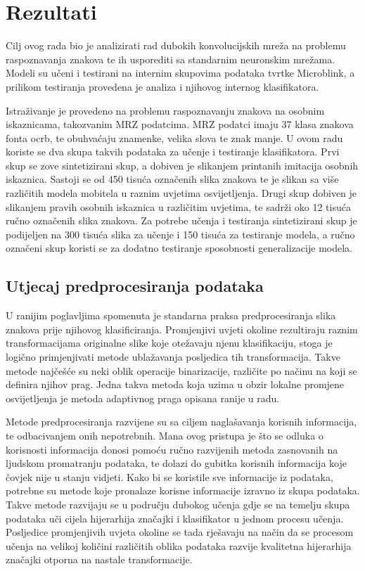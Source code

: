 \documentclass[lmodern, utf8, diplomski, numeric]{fer}
\begin{document}
\chapter{Rezultati}

Cilj ovog rada bio je analizirati rad dubokih konvolucijskih mreža na problemu raspoznavanja znakova te ih usporediti sa standarnim neuronskim mrežama. Modeli su učeni i testirani na internim skupovima podataka tvrtke Microblink, a prilikom testiranja provedena je analiza i njihovog internog klasifikatora. 

Istraživanje je provedeno na problemu raspoznavanju znakova na osobnim iskaznicama, takozvanim MRZ podatcima. MRZ podatci imaju 37 klasa znakova fonta ocrb, te obuhvaćaju znamenke, velika slova te znak manje. U ovom radu koriste se dva skupa takvih podataka za učenje i testiranje klasifikatora. Prvi skup se zove sintetizirani skup, a dobiven je slikanjem printanih imitacija osobnih iskaznica. Sastoji se od 450 tisuća označenih slika znakova te je slikan sa više različitih modela mobitela u raznim uvjetima osvijetljenja. Drugi skup dobiven je slikanjem pravih osobnih iskaznica u različitim uvjetima, te sadrži oko 12 tisuća ručno označenih slika znakova. Za potrebe učenja i testiranja sintetizirani skup je podijeljen na 300 tisuća slika za učenje i 150 tisuća za testiranje modela, a ručno označeni skup koristi se za dodatno testiranje sposobnosti generalizacije modela.



\section{Utjecaj predprocesiranja podataka}


U ranijim poglavljima spomenuta je standarna praksa predprocesiranja slika znakova prije njihovog klasificiranja. Promjenjivi uvjeti okoline rezultiraju raznim transformacijama originalne slike koje otežavaju njenu klasifikaciju, stoga je logično primjenjivati metode ublažavanja posljedica tih transformacija. Takve metode najčešće su neki oblik operacije binarizacije, različite po načinu na koji se definira njihov prag. Jedna takva metoda koja uzima u obzir lokalne promjene osvijetljenja je metoda adaptivnog praga opisana ranije u radu.

Metode predprocesiranja razvijene su sa ciljem naglašavanja korisnih informacija, te odbacivanjem onih nepotrebnih. Mana ovog pristupa je što se odluka o korisnosti informacija donosi pomoću ručno razvijenih metoda zasnovanih na ljudskom promatranju podataka, te dolazi do gubitka korisnih informacija koje čovjek nije u stanju vidjeti. Kako bi se koristile sve informacije iz podataka, potrebne su metode koje pronalaze korisne informacije izravno iz skupa podataka. Takve metode razvijaju se u području dubokog učenja gdje se na temelju skupa podataka uči cijela hijerarhija značajki i klasifikator u jednom procesu učenja. Posljedice promjenjivih uvjeta okoline se tada rješavaju na način da se procesom učenja na velikoj količini različitih oblika podataka razvije kvalitetna hijerarhija značajki otporna na nastale transformacije.
\end{document}
